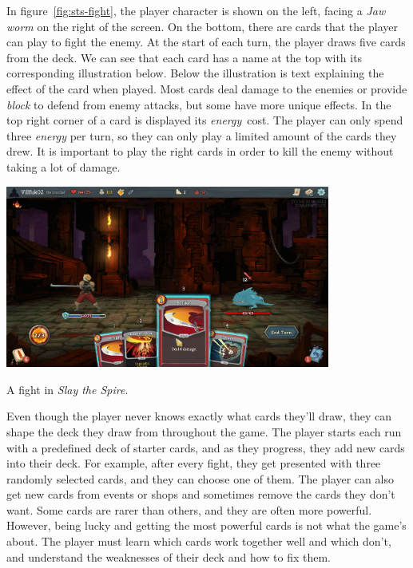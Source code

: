 In figure~\ref{fig:sts-fight}, the player character is shown on the left, facing a \emph{Jaw worm} on the right of the screen.
On the bottom, there are cards that the player can play to fight the enemy.
At the start of each turn, the player draws five cards from the deck.
We can see that each card has a name at the top with its corresponding illustration below.
Below the illustration is text explaining the effect of the card when played.
Most cards deal damage to the enemies or provide \emph{block} to defend from enemy attacks, but some have more unique effects.
In the top right corner of a card is displayed its \emph{energy}~cost.
The player can only spend three \emph{energy} per turn, so they can only play a limited amount of the cards they drew.
It is important to play the right cards in order to kill the enemy without taking a lot of damage.

\begin{center}
    \captionsetup{type=figure}
    \includegraphics[width=0.8\textwidth]{img/Slay-the-Spire-Fight.png}
    \caption{A fight in \emph{Slay the Spire}.}
    \label{fig:sts-fight}
\end{center}

Even though the player never knows exactly what cards they'll draw, they can shape the deck they draw from throughout the game.
The player starts each run with a predefined deck of starter cards, and as they progress, they add new cards into their deck.
For example, after every fight, they get presented with three randomly selected cards, and they can choose one of them.
The player can also get new cards from events or shops and sometimes remove the cards they don't want.
Some cards are rarer than others, and they are often more powerful.
However, being lucky and getting the most powerful cards is not what the game's about.
The player must learn which cards work together well and which don't, and understand the weaknesses of their deck and how to fix them.


